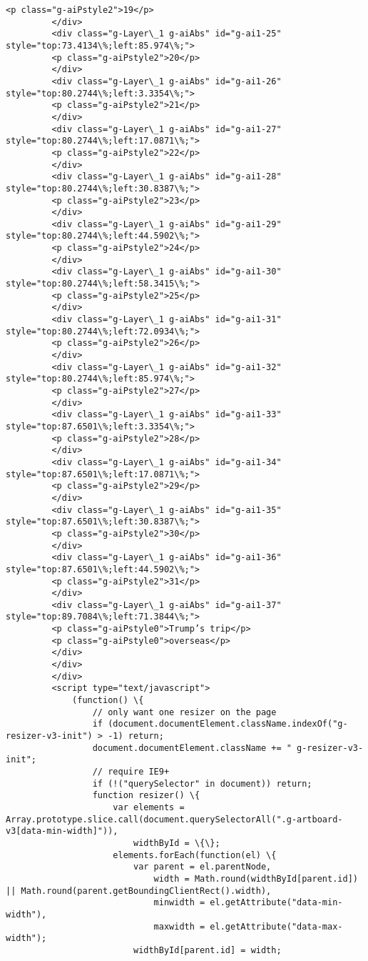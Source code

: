\documentclass[11pt]{article}
\begin{document}
\begin{Verbatim}[commandchars=\\\{\}]
         <p class="g-aiPstyle2">19</p>
         </div>
         <div class="g-Layer\_1 g-aiAbs" id="g-ai1-25" style="top:73.4134\%;left:85.974\%;">
         <p class="g-aiPstyle2">20</p>
         </div>
         <div class="g-Layer\_1 g-aiAbs" id="g-ai1-26" style="top:80.2744\%;left:3.3354\%;">
         <p class="g-aiPstyle2">21</p>
         </div>
         <div class="g-Layer\_1 g-aiAbs" id="g-ai1-27" style="top:80.2744\%;left:17.0871\%;">
         <p class="g-aiPstyle2">22</p>
         </div>
         <div class="g-Layer\_1 g-aiAbs" id="g-ai1-28" style="top:80.2744\%;left:30.8387\%;">
         <p class="g-aiPstyle2">23</p>
         </div>
         <div class="g-Layer\_1 g-aiAbs" id="g-ai1-29" style="top:80.2744\%;left:44.5902\%;">
         <p class="g-aiPstyle2">24</p>
         </div>
         <div class="g-Layer\_1 g-aiAbs" id="g-ai1-30" style="top:80.2744\%;left:58.3415\%;">
         <p class="g-aiPstyle2">25</p>
         </div>
         <div class="g-Layer\_1 g-aiAbs" id="g-ai1-31" style="top:80.2744\%;left:72.0934\%;">
         <p class="g-aiPstyle2">26</p>
         </div>
         <div class="g-Layer\_1 g-aiAbs" id="g-ai1-32" style="top:80.2744\%;left:85.974\%;">
         <p class="g-aiPstyle2">27</p>
         </div>
         <div class="g-Layer\_1 g-aiAbs" id="g-ai1-33" style="top:87.6501\%;left:3.3354\%;">
         <p class="g-aiPstyle2">28</p>
         </div>
         <div class="g-Layer\_1 g-aiAbs" id="g-ai1-34" style="top:87.6501\%;left:17.0871\%;">
         <p class="g-aiPstyle2">29</p>
         </div>
         <div class="g-Layer\_1 g-aiAbs" id="g-ai1-35" style="top:87.6501\%;left:30.8387\%;">
         <p class="g-aiPstyle2">30</p>
         </div>
         <div class="g-Layer\_1 g-aiAbs" id="g-ai1-36" style="top:87.6501\%;left:44.5902\%;">
         <p class="g-aiPstyle2">31</p>
         </div>
         <div class="g-Layer\_1 g-aiAbs" id="g-ai1-37" style="top:89.7084\%;left:71.3844\%;">
         <p class="g-aiPstyle0">Trump’s trip</p>
         <p class="g-aiPstyle0">overseas</p>
         </div>
         </div>
         </div>
         <script type="text/javascript">
             (function() \{
                 // only want one resizer on the page
                 if (document.documentElement.className.indexOf("g-resizer-v3-init") > -1) return;
                 document.documentElement.className += " g-resizer-v3-init";
                 // require IE9+
                 if (!("querySelector" in document)) return;
                 function resizer() \{
                     var elements = Array.prototype.slice.call(document.querySelectorAll(".g-artboard-v3[data-min-width]")),
                         widthById = \{\};
                     elements.forEach(function(el) \{
                         var parent = el.parentNode,
                             width = Math.round(widthById[parent.id]) || Math.round(parent.getBoundingClientRect().width),
                             minwidth = el.getAttribute("data-min-width"),
                             maxwidth = el.getAttribute("data-max-width");
                         widthById[parent.id] = width;
         

\end{Verbatim}
\end{document}

